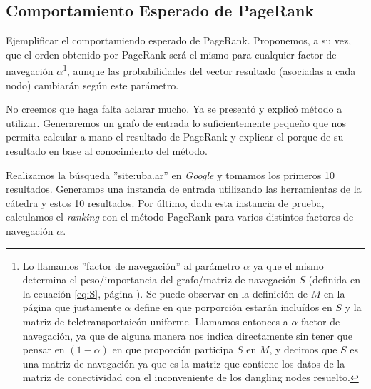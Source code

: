 \subsection{Comportamiento Esperado de PageRank}
\label{subsec:exp1}
\begin{LaTeXdescription}
    \item[Objetivo] Ejemplificar el comportamiendo esperado de PageRank.
        Proponemos, a su vez, que el orden obtenido por PageRank ser\'a el mismo
        para cualquier factor de navegaci\'on $\alpha$\footnote{Lo llamamos
        ''factor de navegaci\'on'' al par\'ametro $\alpha$ ya que el mismo
        determina el peso/importancia del grafo/matriz de navegaci\'on $S$
        (definida en la ecuaci\'on \ref{eq:S}, p\'agina \pageref{eq:S}). Se
        puede observar en la definici\'on de $M$ en la p\'agina
        \pageref{eq:M_def} que justamente $\alpha$ define en que porporci\'on
        estar\'an inclu\'idos en $S$ y la matriz de teletransportaic\'on
        uniforme. Llamamos entonces a $\alpha$ factor de navegaci\'on, ya
        que de alguna manera nos indica directamente sin tener que pensar en
        $(1-\alpha)$ en que proporci\'on participa $S$ en $M$, y decimos que
        $S$ es una matriz de navegaci\'on ya que es la matriz que contiene
        los datos de la matriz de conectividad con el inconveniente de los
        dangling nodes resuelto.}, aunque las probabilidades del vector
        resultado (asociadas a cada nodo) cambiar\'an seg\'un este
        par\'ametro.\\

    \item[Proposici\'on] No creemos que haga falta aclarar mucho. Ya se
        present\'o y explic\'o m\'etodo a utilizar. Generaremos un grafo de
        entrada lo suficientemente peque\~no que nos permita calcular a mano el
        resultado de PageRank y explicar el porque de su resultado en base al
        conocimiento del m\'etodo.\\

    \item[M\'etodo de Experimentaci\'on] Realizamos la b\'usqueda
        ''site:uba.ar'' en \emph{Google}\cite{google} y tomamos los primeros 10
        resultados.  Generamos una instancia de entrada utilizando las
        herramientas de la c\'atedra y estos 10 resultados. Por \'ultimo, dada
        esta instancia de prueba, calculamos el \emph{ranking} con el m\'etodo
        PageRank para varios distintos factores de navegaci\'on $\alpha$.\\

    \item[Resultados, an\'alisis y discusi\'on]
\end{LaTeXdescription}

